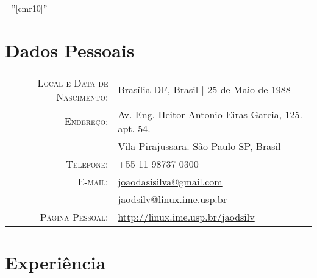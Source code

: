 \documentclass[a4paper,10pt]{article} %
\begin{document}
\pagestyle{empty} %

\font\fb=''[cmr10]'' %


\par{\bigskip\par} %

\section{Dados Pessoais}

\begin{tabular}{rl}
\textsc{Local e Data de Nascimento:} & Brasília-DF, Brasil | 25 de Maio de 1988 \\
\textsc{Endereço:} & Av. Eng. Heitor Antonio Eiras Garcia, 125. apt. 54.\\& Vila Pirajussara. São Paulo-SP, Brasil \\
\textsc{Telefone:} & +55 11 98737 0300\\
\textsc{E-mail:} & \href{mailto:joaodasisilva@gmail.com}{joaodasisilva@gmail.com}\\
& \href{mailto:jaodsilv@linux.ime.usp.br}{jaodsilv@linux.ime.usp.br}\\
\textsc{Página Pessoal:} & \href{http://linux.ime.usp.br/jaodsilv}{http://linux.ime.usp.br/jaodsilv}\\
\end{tabular}



\section{Experiência}
\end{document}
